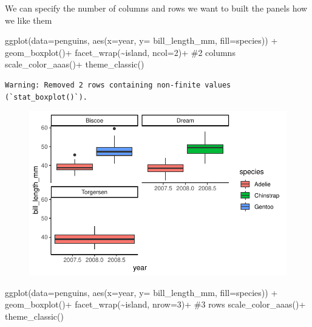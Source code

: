 \documentclass[
  letterpaper,
  DIV=11,
  numbers=noendperiod]{scrartcl}
\newenvironment{Shaded}{\begin{snugshade}}{\end{snugshade}}
\newcommand{\AttributeTok}[1]{\textcolor[rgb]{0.40,0.45,0.13}{#1}}
\newcommand{\CommentTok}[1]{\textcolor[rgb]{0.37,0.37,0.37}{#1}}
\newcommand{\DecValTok}[1]{\textcolor[rgb]{0.68,0.00,0.00}{#1}}
\newcommand{\FunctionTok}[1]{\textcolor[rgb]{0.28,0.35,0.67}{#1}}
\newcommand{\NormalTok}[1]{\textcolor[rgb]{0.00,0.23,0.31}{#1}}
\newcommand{\SpecialCharTok}[1]{\textcolor[rgb]{0.37,0.37,0.37}{#1}}
\begin{document}
We can specify the number of columns and rows we want to built the
panels how we like them

\begin{Shaded}
\begin{Highlighting}[]
\FunctionTok{ggplot}\NormalTok{(}\AttributeTok{data=}\NormalTok{penguins, }\FunctionTok{aes}\NormalTok{(}\AttributeTok{x=}\NormalTok{year, }\AttributeTok{y=}\NormalTok{ bill\_length\_mm, }\AttributeTok{fill=}\NormalTok{species)) }\SpecialCharTok{+}
  \FunctionTok{geom\_boxplot}\NormalTok{()}\SpecialCharTok{+}
  \FunctionTok{facet\_wrap}\NormalTok{(}\SpecialCharTok{\textasciitilde{}}\NormalTok{island, }\AttributeTok{ncol=}\DecValTok{2}\NormalTok{)}\SpecialCharTok{+} \CommentTok{\#2 columns }
  \FunctionTok{scale\_color\_aaas}\NormalTok{()}\SpecialCharTok{+}
  \FunctionTok{theme\_classic}\NormalTok{()}
\end{Highlighting}
\end{Shaded}

\begin{verbatim}
Warning: Removed 2 rows containing non-finite values (`stat_boxplot()`).
\end{verbatim}

\begin{figure}[H]

{\centering \includegraphics{facets_files/figure-pdf/unnamed-chunk-3-1.pdf}

}

\end{figure}

\begin{Shaded}
\begin{Highlighting}[]
\FunctionTok{ggplot}\NormalTok{(}\AttributeTok{data=}\NormalTok{penguins, }\FunctionTok{aes}\NormalTok{(}\AttributeTok{x=}\NormalTok{year, }\AttributeTok{y=}\NormalTok{ bill\_length\_mm, }\AttributeTok{fill=}\NormalTok{species)) }\SpecialCharTok{+}
  \FunctionTok{geom\_boxplot}\NormalTok{()}\SpecialCharTok{+}
  \FunctionTok{facet\_wrap}\NormalTok{(}\SpecialCharTok{\textasciitilde{}}\NormalTok{island, }\AttributeTok{nrow=}\DecValTok{3}\NormalTok{)}\SpecialCharTok{+} \CommentTok{\#3 rows}
  \FunctionTok{scale\_color\_aaas}\NormalTok{()}\SpecialCharTok{+}
  \FunctionTok{theme\_classic}\NormalTok{()}
\end{Highlighting}
\end{Shaded}
\end{document}
